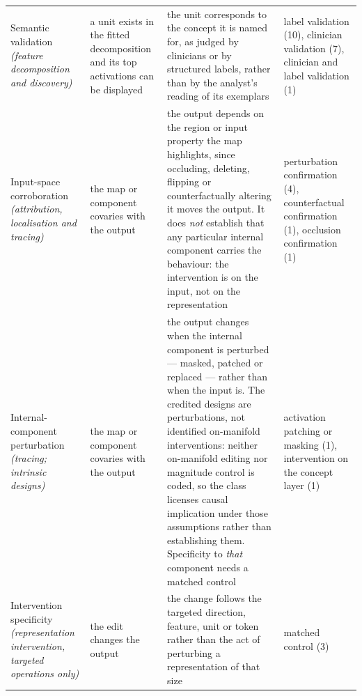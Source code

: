 \begin{table}
\begin{tabular}{@{}L{3.0cm}L{3.6cm}L{10.5cm}L{3.6cm}@{}}
Semantic validation \emph{(feature decomposition and discovery)} & a unit exists in the fitted decomposition and its top activations can be displayed & the unit corresponds to the concept it is named for, as judged by clinicians or by structured labels, rather than by the analyst's reading of its exemplars & label validation (10), clinician validation (7), clinician and label validation (1) \\
Input-space corroboration \emph{(attribution, localisation and tracing)} & the map or component covaries with the output & the output depends on the region or input property the map highlights, since occluding, deleting, flipping or counterfactually altering it moves the output. It does \emph{not} establish that any particular internal component carries the behaviour: the intervention is on the input, not on the representation & perturbation confirmation (4), counterfactual confirmation (1), occlusion confirmation (1) \\
Internal-component perturbation \emph{(tracing; intrinsic designs)} & the map or component covaries with the output & the output changes when the internal component is perturbed --- masked, patched or replaced --- rather than when the input is. The credited designs are perturbations, not identified on-manifold interventions: neither on-manifold editing nor magnitude control is coded, so the class licenses causal implication under those assumptions rather than establishing them. Specificity to \emph{that} component needs a matched control & activation patching or masking (1), intervention on the concept layer (1) \\
Intervention specificity \emph{(representation intervention, targeted operations only)} & the edit changes the output & the change follows the targeted direction, feature, unit or token rather than the act of perturbing a representation of that size & matched control (3) \\
\bottomrule
\end{tabular}
\end{table}
